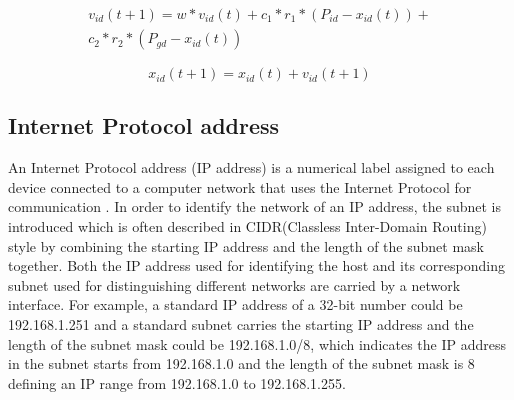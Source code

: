 \documentclass[conference]{IEEEtran}
\begin{document}
\begin{equation}\label{eq:UpdateV}
	\begin{aligned}
	v_{id}(t+1) = w * v_{id}(t) + c_{1} * r_{1} * (P_{id} - x_{id}(t)) + \\
	c_{2} * r_{2} * (P_{gd} - x_{id}(t))
	\end{aligned}
\end{equation}

\begin{equation}\label{eq:UpdateX}
	x_{id}(t+1) = x_{id}(t) + v_{id}(t+1)
\end{equation}

\subsection{Internet Protocol address}

An Internet Protocol address (IP address) is a numerical label assigned to each device connected to a computer network that uses the Internet Protocol for communication \cite{IP:Postel}. In order to identify the network of an IP address, the subnet is introduced which is often described in CIDR(Classless Inter-Domain Routing) style \cite{CIDR:Fuller} by combining the starting IP address and the length of the subnet mask together. Both the IP address used for identifying the host and its corresponding subnet used for distinguishing different networks are carried by a network interface. For example, a standard IP address of a 32-bit number could be 192.168.1.251 and a standard subnet carries the starting IP address and the length of the subnet mask could be 192.168.1.0/8, which indicates the IP address in the subnet starts from 192.168.1.0 and the length of the subnet mask is 8 defining an IP range from 192.168.1.0 to 192.168.1.255. 


%
\end{document}
